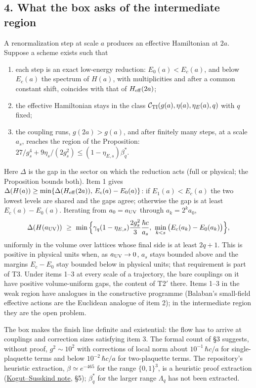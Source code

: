 \documentclass[11pt,a4paper]{article}
\newcommand{\tightlist}{\setlength{\itemsep}{0pt}\setlength{\parskip}{0pt}}
\begin{document}
\hypertarget{what-the-box-asks-of-the-intermediate-region}{%
\subsection{4. What the box asks of the intermediate
region}\label{what-the-box-asks-of-the-intermediate-region}}

A renormalization step at scale \(a\) produces an effective Hamiltonian
at \(2a\). Suppose a scheme exists such that

\begin{enumerate}
\def\labelenumi{\arabic{enumi}.}
\tightlist
\item
  each step is an exact low-energy reduction: \(E_0(a)<E_c(a)\), and
  below \(E_c(a)\) the spectrum of \(H(a)\), with multiplicities and
  after a common constant shift, coincides with that of
  \(H_{\rm eff}(2a)\);
\item
  the effective Hamiltonian stays in the class
  \(\mathcal C_{\rm TI}(g(a),\eta(a),\eta_E(a),q)\) with \(q\) fixed;
\item
  the coupling runs, \(g(2a)>g(a)\), and after finitely many steps, at a
  scale \(a_s\), reaches the region of the Proposition:
  \(27/g_s^4+9\eta_s/(2g_s^2)\le(1-\eta_{E,s})\beta^*_q\).
\end{enumerate}

Here \(\Delta\) is the gap in the sector on which the reduction acts
(full or physical; the Proposition bounds both). Item 1 gives
\(\Delta(H(a))\ge\min\{\Delta(H_{\rm eff}(2a)),\,E_c(a)-E_0(a)\}\): if
\(E_1(a)<E_c(a)\) the two lowest levels are shared and the gaps agree;
otherwise the gap is at least \(E_c(a)-E_0(a)\). Iterating from
\(a_0=a_{\rm UV}\) through \(a_k=2^ka_0\),
\[\Delta(H(a_{\rm UV}))\ \ge\ \min\Big\{\gamma_q(1-\eta_{E,s})\frac{2g_s^2}3\frac{\hbar c}{a_s},\
\min_{k<s}\big(E_c(a_k)-E_0(a_k)\big)\Big\},\] uniformly in the volume
over lattices whose final side is at least \(2q+1\). This is positive in
physical units when, as \(a_{\rm UV}\to0\), \(a_s\) stays bounded above
and the margins \(E_c-E_0\) stay bounded below in physical units; that
requirement is part of T3. Under items 1--3 at every scale of a
trajectory, the bare couplings on it have positive volume-uniform gaps,
the content of T2\('\) there. Items 1--3 in the weak region have
analogues in the constructive programme (Balaban's small-field effective
actions are the Euclidean analogue of item 2); in the intermediate
region they are the open problem.

The box makes the finish line definite and existential: the flow has to
arrive at couplings and correction sizes satisfying item 3. The formal
count of §3 suggests, without proof, \(g^2\sim10^2\) with corrections of
local norm about \(10^{-1}\,\hbar c/a\) for single-plaquette terms and
below \(10^{-2}\,\hbar c/a\) for two-plaquette terms. The repository's
heuristic extraction, \(\beta\simeq e^{-465}\) for the range
\(\{0,1\}^3\), is a heuristic proof extraction
(\href{kogut-susskind-strong-coupling-explicit.md}{Kogut--Susskind
note}, §5); \(\beta^*_q\) for the larger range \(\Lambda_q\) has not
been extracted.
\end{document}
